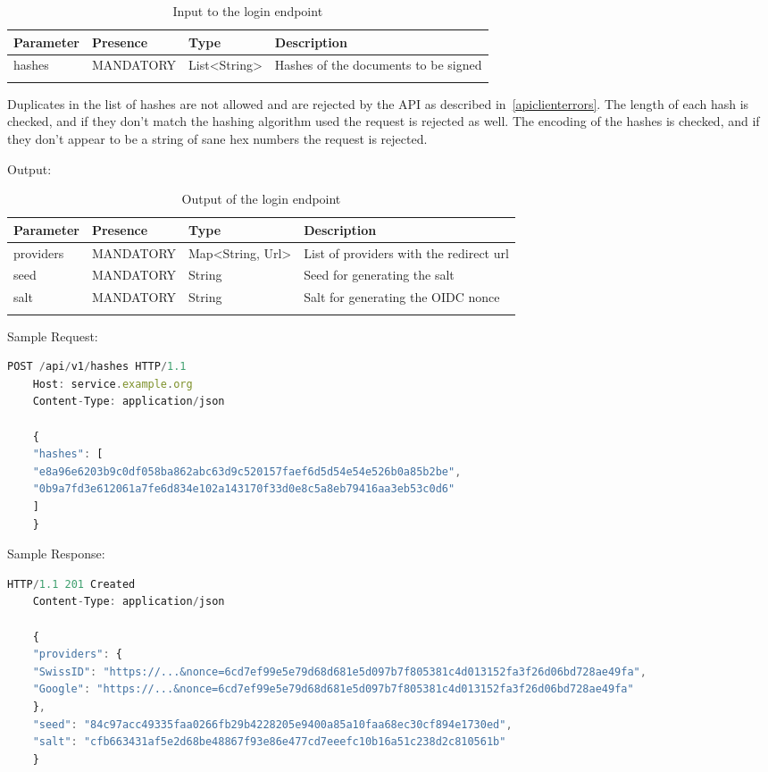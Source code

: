 \begin{longtable}{|l|l|l|l|}
    \hline
    \textbf{Parameter} & \textbf{Presence} & \textbf{Type} & \textbf{Description} \\ \hline
    hashes & MANDATORY & List<String> & Hashes of the documents to be signed \\ \hline
    \caption{Input to the login endpoint}
\end{longtable}

Duplicates in the list of hashes are not allowed and are rejected by the API as described in~\ref{apiclienterrors}.
The length of each hash is checked, and if they don't match the hashing algorithm used the request is rejected as well.
The encoding of the hashes is checked, and if they don't appear to be a string of sane hex numbers the request is rejected.

Output:

\begin{longtable}{|l|l|l|l|}
    \hline
    \textbf{Parameter} & \textbf{Presence} & \textbf{Type} & \textbf{Description} \\ \hline
    providers & MANDATORY & Map<String, Url> & List of providers with the redirect url \\ \hline
    seed & MANDATORY & String & Seed for generating the salt \\ \hline
    salt & MANDATORY & String & Salt for generating the OIDC nonce \\ \hline
    \caption{Output of the login endpoint}
\end{longtable}

Sample Request:
\begin{lstlisting}[caption={login request}, captionpos=b, language=JavaScript, label={lst:hashesrequest}]
    POST /api/v1/hashes HTTP/1.1
    Host: service.example.org
    Content-Type: application/json

    {
    "hashes": [
    "e8a96e6203b9c0df058ba862abc63d9c520157faef6d5d54e54e526b0a85b2be",
    "0b9a7fd3e612061a7fe6d834e102a143170f33d0e8c5a8eb79416aa3eb53c0d6"
    ]
    }
\end{lstlisting}

Sample Response:
\begin{lstlisting}[caption={login response}, captionpos=b, language=JavaScript, label={lst:hashesresponse}]
    HTTP/1.1 201 Created
    Content-Type: application/json

    {
    "providers": {
    "SwissID": "https://...&nonce=6cd7ef99e5e79d68d681e5d097b7f805381c4d013152fa3f26d06bd728ae49fa",
    "Google": "https://...&nonce=6cd7ef99e5e79d68d681e5d097b7f805381c4d013152fa3f26d06bd728ae49fa"
    },
    "seed": "84c97acc49335faa0266fb29b4228205e9400a85a10faa68ec30cf894e1730ed",
    "salt": "cfb663431af5e2d68be48867f93e86e477cd7eeefc10b16a51c238d2c810561b"
    }
\end{lstlisting}

